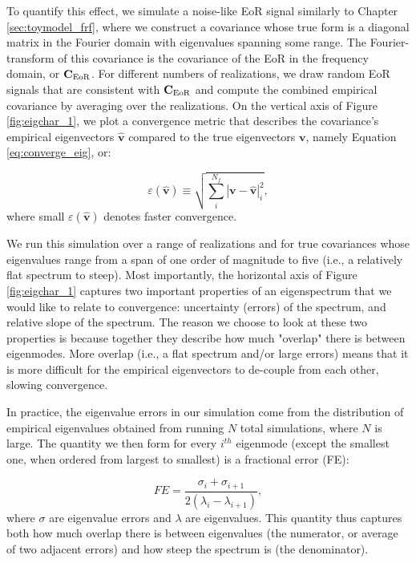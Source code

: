 To quantify this effect, we simulate a noise-like EoR signal similarly to Chapter \ref{sec:toymodel_frf}, where we construct a covariance whose true form is a diagonal matrix in the Fourier domain with eigenvalues spanning some range. The Fourier-transform of this covariance is the covariance of the EoR in the frequency domain, or $\textbf{C}_{\rm EoR}$. For different numbers of realizations, we draw random EoR signals that are consistent with $\textbf{C}_{\rm EoR}$ and compute the combined empirical covariance by averaging over the realizations. On the vertical axis of Figure \ref{fig:eigchar_1}, we plot a convergence metric that describes the covariance's empirical eigenvectors $\widehat{\textbf{v}}$ compared to the true eigenvectors $\textbf{v}$, namely Equation \eqref{eq:converge_eig}, or:

\begin{equation}
\label{eq:converge_eig2}
\varepsilon (\widehat{\textbf{v}}) \equiv \sqrt{\sum_{i}^{N_{f}}|\textbf{v}-\widehat{\textbf{v}}|_{i}^2},
\end{equation}
where small $\varepsilon (\widehat{\textbf{v}})$ denotes faster convergence.

We run this simulation over a range of realizations and for true covariances whose eigenvalues range from a span of one order of magnitude to five (i.e., a relatively flat spectrum to steep). Most importantly, the horizontal axis of Figure \ref{fig:eigchar_1} captures two important properties of an eigenspectrum that we would like to relate to convergence: uncertainty (errors) of the spectrum, and relative slope of the spectrum. The reason we choose to look at these two properties is because together they describe how much "overlap" there is between eigenmodes. More overlap (i.e., a flat spectrum and/or large errors) means that it is more difficult for the empirical eigenvectors to de-couple from each other, slowing convergence. 

In practice, the eigenvalue errors in our simulation come from the distribution of empirical eigenvalues obtained from running $N$ total simulations, where $N$ is large. The quantity we then form for every $i^{th}$ eigenmode (except the smallest one, when ordered from largest to smallest) is a fractional error (FE):

\begin{equation}
FE = \frac{\sigma_{i} + \sigma_{i+1}}{2(\lambda_{i} - \lambda_{i+1})},
\end{equation}
where $\sigma$ are eigenvalue errors and $\lambda$ are eigenvalues. This quantity thus captures both how much overlap there is between eigenvalues (the numerator, or average of two adjacent errors) and how steep the spectrum is (the denominator). 

